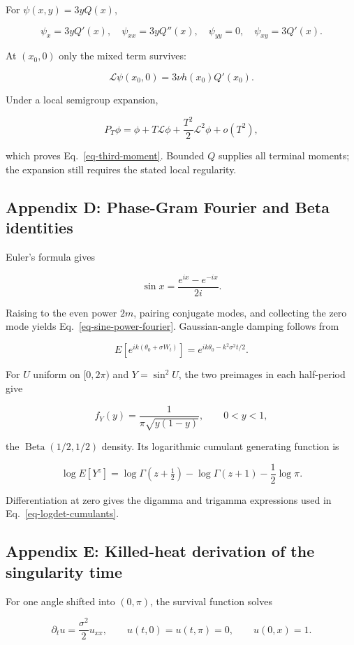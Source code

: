\documentclass[
  english,
  11pt,
  letterpaper,
  DIV=11,
  numbers=noendperiod]{scrartcl}
\theoremstyle{plain}
\theoremstyle{plain}
\theoremstyle{plain}
\theoremstyle{plain}
\theoremstyle{remark}
\begin{document}
For \(\psi(x,y)=3yQ(x)\),

\[
\psi_x=3yQ'(x),\quad
\psi_{xx}=3yQ''(x),\quad
\psi_{yy}=0,\quad
\psi_{xy}=3Q'(x).
\]

At \((x_0,0)\) only the mixed term survives:

\[
\mathcal L\psi(x_0,0)
=3\nu h(x_0)Q'(x_0).
\]

Under a local semigroup expansion,

\[
P_T\phi
=\phi+T\mathcal L\phi+\frac{T^2}{2}\mathcal L^2\phi+o(T^2),
\]

which proves Eq.~\ref{eq-third-moment}. Bounded \(Q\) supplies all
terminal moments; the expansion still requires the stated local
regularity.

\subsection{Appendix D: Phase-Gram Fourier and Beta
identities}\label{sec-app-phasegram}

Euler's formula gives

\[
\sin x=\frac{e^{ix}-e^{-ix}}{2i}.
\]

Raising to the even power \(2m\), pairing conjugate modes, and
collecting the zero mode yields Eq.~\ref{eq-sine-power-fourier}.
Gaussian-angle damping follows from

\[
E[e^{ik(\theta_0+\sigma W_t)}]
=e^{ik\theta_0-k^2\sigma^2t/2}.
\]

For \(U\) uniform on \([0,2\pi)\) and \(Y=\sin^2U\), the two preimages
in each half-period give

\[
f_Y(y)=\frac{1}{\pi\sqrt{y(1-y)}},
\qquad 0<y<1,
\]

the \(\operatorname{Beta}(1/2,1/2)\) density. Its logarithmic cumulant
generating function is

\[
\log E[Y^z]
=\log\Gamma(z+\tfrac12)-\log\Gamma(z+1)-\frac12\log\pi.
\]

Differentiation at zero gives the digamma and trigamma expressions used
in Eq.~\ref{eq-logdet-cumulants}.

\subsection{Appendix E: Killed-heat derivation of the singularity
time}\label{sec-app-exit}

For one angle shifted into \((0,\pi)\), the survival function solves

\[
\partial_tu=\frac{\sigma^2}{2}u_{xx},
\qquad
u(t,0)=u(t,\pi)=0,
\qquad
u(0,x)=1.
\]
\end{document}
